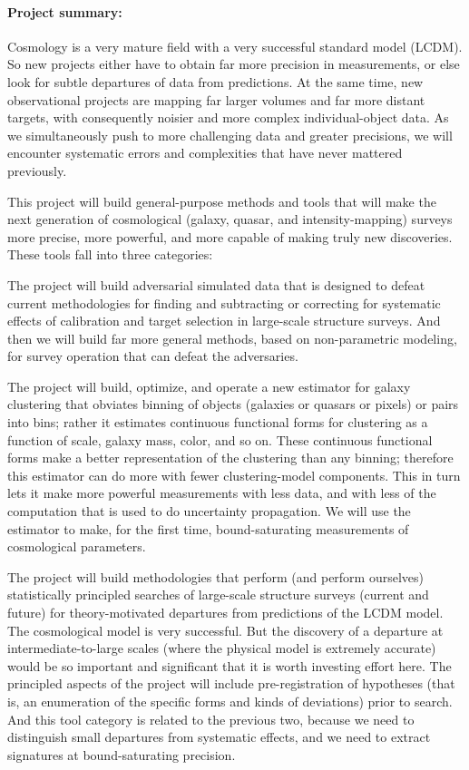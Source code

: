 \documentclass[12pt, fullpage, letterpaper]{article}
\begin{document}
\paragraph{Project summary:}
Cosmology is a very mature field with a very successful standard model
(LCDM).
So new projects either have to obtain far more precision in
measurements, or else look for subtle departures of data from
predictions.
At the same time, new observational projects are mapping far larger
volumes and far more distant targets, with consequently noisier and
more complex individual-object data.
As we simultaneously push to more challenging data and greater
precisions, we will encounter systematic errors and complexities that
have never mattered previously.

This project will build general-purpose methods and tools that will
make the next generation of cosmological (galaxy, quasar, and
intensity-mapping) surveys more precise, more powerful, and more
capable of making truly new discoveries.
These tools fall into three categories:

The project will build adversarial simulated data that is designed to
defeat current methodologies for finding and subtracting or correcting
for systematic effects of calibration and target selection in
large-scale structure surveys.
And then we will build far more general methods, based on
non-parametric modeling, for survey operation that can defeat the
adversaries.

The project will build, optimize, and operate a new estimator for
galaxy clustering that obviates binning of objects (galaxies or
quasars or pixels) or pairs into bins; rather it estimates continuous
functional forms for clustering as a function of scale, galaxy mass,
color, and so on.
These continuous functional forms make a better representation of the
clustering than any binning; therefore this estimator can do more with
fewer clustering-model components.
This in turn lets it make more powerful measurements with less data,
and with less of the computation that is used to do uncertainty
propagation.
We will use the estimator to make, for the first time,
bound-saturating measurements of cosmological parameters.

The project will build methodologies that perform (and perform
ourselves) statistically principled searches of large-scale structure
surveys (current and future) for theory-motivated departures from
predictions of the LCDM model.
The cosmological model is very successful.
But the discovery of a departure at intermediate-to-large scales
(where the physical model is extremely accurate) would be so important
and significant that it is worth investing effort here.
The principled aspects of the project will include pre-registration of
hypotheses (that is, an enumeration of the specific forms and kinds of
deviations) prior to search.
And this tool category is related to the previous two, because we need
to distinguish small departures from systematic effects, and we need
to extract signatures at bound-saturating precision.
\end{document}
